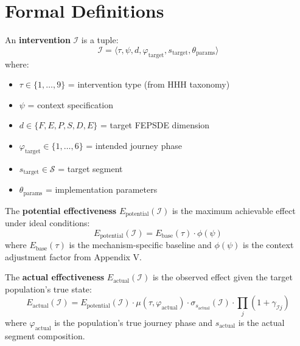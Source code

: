 \section{Formal Definitions}
\label{sec:eih-definitions}

\begin{definition}[Intervention]
\label{def:intervention}
An \textbf{intervention} $\mathcal{I}$ is a tuple:
\begin{equation}
\mathcal{I} = \langle \tau, \psi, d, \varphi_{\text{target}}, s_{\text{target}}, \theta_{\text{params}} \rangle
\end{equation}
where:
\begin{itemize}[nosep]
\item $\tau \in \{1, \ldots, 9\}$ = intervention type (from HHH taxonomy)
\item $\psi$ = context specification
\item $d \in \{F, E, P, S, D, E\}$ = target FEPSDE dimension
\item $\varphi_{\text{target}} \in \{1, \ldots, 6\}$ = intended journey phase
\item $s_{\text{target}} \in \mathcal{S}$ = target segment
\item $\theta_{\text{params}}$ = implementation parameters
\end{itemize}
\end{definition}

\begin{definition}
\label{def:potential}
The \textbf{potential effectiveness} $E_{\text{potential}}(\mathcal{I})$ is the
maximum achievable effect under ideal conditions:
\begin{equation}
E_{\text{potential}}(\mathcal{I}) = E_{\text{base}}(\tau) \cdot \phi(\psi)
\end{equation}
where $E_{\text{base}}(\tau)$ is the mechanism-specific baseline and $\phi(\psi)$
is the context adjustment factor from Appendix V.
\end{definition}

\begin{definition}
\label{def:actual}
The \textbf{actual effectiveness} $E_{\text{actual}}(\mathcal{I})$ is the observed
effect given the target population's true state:
\begin{equation}
E_{\text{actual}}(\mathcal{I}) = E_{\text{potential}}(\mathcal{I}) \cdot \mu(\tau, \varphi_{\text{actual}}) \cdot \sigma_{s_{\text{actual}}}(\mathcal{I}) \cdot \prod_j (1 + \gamma_{\mathcal{I}j})
\end{equation}
where $\varphi_{\text{actual}}$ is the population's true journey phase and
$s_{\text{actual}}$ is the actual segment composition.
\end{definition}

